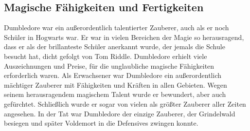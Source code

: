 \documentclass[a4paper, 10pt]{article}
\begin{document}
\subsection*{\Large Magische Fähigkeiten und Fertigkeiten}
Dumbledore war ein außerordentlich talentierter Zauberer, auch als er noch Schüler in Hogwarts war. Er war in vielen Bereichen der Magie so herausragend, dass er als der brillanteste Schüler anerkannt wurde, der jemals die Schule besucht hat, dicht gefolgt von Tom Riddle. Dumbledore erhielt viele Auszeichnungen und Preise, für die unglaubliche magische Fähigkeiten erforderlich waren. Als Erwachsener war Dumbledore ein außerordentlich mächtiger Zauberer mit Fähigkeiten und Kräften in allen Gebieten. Wegen seinem herausragendem magischem Talent wurde er bewundert, aber auch gefürchtet. Schließlich wurde er sogar von vielen als größter Zauberer aller Zeiten angesehen. In der Tat war Dumbledore der einzige Zauberer, der Grindelwald besiegen und später Voldemort in die Defensives zwingen konnte.
\end{document}
